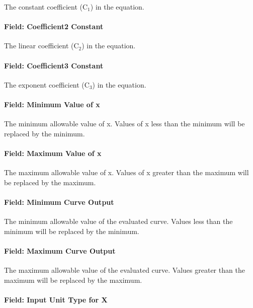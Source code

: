 The constant coefficient (C\(_{1}\)) in the equation.

\paragraph{Field: Coefficient2 Constant}\label{field-coefficient2-constant}

The linear coefficient (C\(_{2}\)) in the equation.

\paragraph{Field: Coefficient3 Constant}\label{field-coefficient3-constant}

The exponent coefficient (C\(_{3}\)) in the equation.

\paragraph{Field: Minimum Value of x}\label{field-minimum-value-of-x-5}

The minimum allowable value of x. Values of x less than the minimum will be replaced by the minimum.

\paragraph{Field: Maximum Value of x}\label{field-maximum-value-of-x-6}

The maximum allowable value of x. Values of x greater than the maximum will be replaced by the maximum.

\paragraph{Field: Minimum Curve Output}\label{field-minimum-curve-output-4}

The minimum allowable value of the evaluated curve. Values less than the minimum will be replaced by the minimum.

\paragraph{Field: Maximum Curve Output}\label{field-maximum-curve-output-3}

The maximum allowable value of the evaluated curve. Values greater than the maximum will be replaced by the maximum.

\paragraph{Field: Input Unit Type for X}\label{field-input-unit-type-for-x-5}

